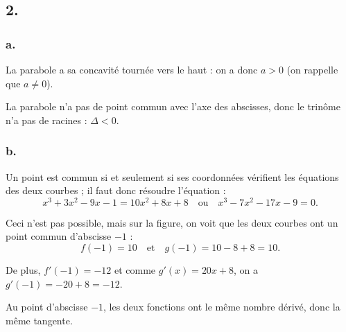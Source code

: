 	\subsection*{2.}
	
	\subsubsection*{a.}
	
	La parabole a sa concavité tournée vers le haut : on a donc \(a > 0\) (on rappelle que \(a \neq 0\)).
	
	La parabole n'a pas de point commun avec l'axe des abscisses, donc le trinôme n'a pas de racines : \(\Delta < 0\).
	
	\subsubsection*{b.}
	
	Un point est commun si et seulement si ses coordonnées vérifient les équations des deux courbes ; il faut donc résoudre l'équation :
	\[
	x^3 + 3x^2 - 9x - 1 = 10x^2 + 8x + 8 \quad \text{ou} \quad x^3 - 7x^2 - 17x - 9 = 0.
	\]
	
	Ceci n'est pas possible, mais sur la figure, on voit que les deux courbes ont un point commun d'abscisse \(-1\) :
	\[
	f(-1) = 10 \quad \text{et} \quad g(-1) = 10 - 8 + 8 = 10.
	\]
	
	De plus, \(f'(-1) = -12\) et comme \(g'(x) = 20x + 8\), on a \(g'(-1) = -20 + 8 = -12\).
	
	Au point d'abscisse \(-1\), les deux fonctions ont le même nombre dérivé, donc la même tangente.
